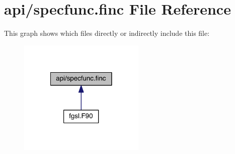 \hypertarget{specfunc_8finc}{\section{api/specfunc.finc File Reference}
\label{specfunc_8finc}
}
This graph shows which files directly or indirectly include this file\-:
\nopagebreak
\begin{figure}[H]
\begin{center}
\leavevmode
\includegraphics[width=170pt]{specfunc_8finc__dep__incl}
\end{center}
\end{figure}
